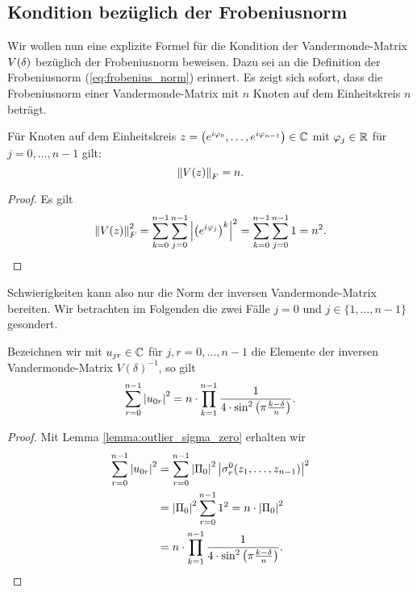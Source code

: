 \subsection{Kondition bezüglich der Frobeniusnorm}
Wir wollen nun eine explizite Formel für die Kondition der Vandermonde-Matrix
$V \! \left( \delta \right)$ bezüglich der Frobeniusnorm beweisen.
Dazu sei an die Definition der Frobeniusnorm (\ref{eq:frobenius_norm}) erinnert.
Es zeigt sich sofort, dass die Frobeniusnorm einer Vandermonde-Matrix mit
$n$ Knoten auf dem Einheitskreis $n$ beträgt.

\begin{lemma}
    Für Knoten auf dem Einheitskreis
    $z = \left(e^{i \varphi_0}, \dots, e^{i \varphi_{n-1}} \right) \in \mathbb{C}$
    mit $\varphi_j \in \mathbb{R}$ für $j = 0, \dots, n-1$ gilt:
    \begin{equation}
        \left\lVert V \! \left( z \right) \right\rVert_F = n.
    \end{equation}
\end{lemma}
\begin{proof}
    Es gilt
    \[
        \left\lVert V \! \left( z \right) \right\rVert_F^2
        = \sum_{k=0}^{n-1} \sum_{j=0}^{n-1} \left\lvert  \left(e^{i \varphi_j}\right)^k  \right\rvert^2
        = \sum_{k=0}^{n-1} \sum_{j=0}^{n-1} 1
        = n^2.
    \]
\end{proof}

Schwierigkeiten kann also nur die Norm der inversen Vandermonde-Matrix
bereiten.  Wir betrachten im Folgenden die zwei Fälle $j=0$ und
$j \in \{1, \dots, n-1\}$ gesondert.

\begin{lemma}
    \label{lemma:inverse_outlier_zero_row_quadratic_sum}
    Bezeichnen wir mit $u_{jr} \in \mathbb{C}$ für $j, r = 0, \dots, n-1$ die Elemente
    der inversen Vandermonde-Matrix $V(\delta)^{-1}$, so gilt
    \[
        \sum_{r=0}^{n-1} \left\lvert u_{0r} \right\rvert^2
        = n \cdot \prod_{k=1}^{n-1} \frac{1}{4 \cdot \sin^2 \left( \pi \frac{k-\delta}{n} \right)}.
    \]
\end{lemma}
\begin{proof}
    Mit Lemma \ref{lemma:outlier_sigma_zero} erhalten wir
    \[
        \begin{split}
            \sum_{r=0}^{n-1} \left\lvert u_{0r} \right\rvert^2
            &= \sum_{r=0}^{n-1} \left\lvert \Pi_0 \right\rvert^2 \left\lvert \sigma_{r}^{0}(z_1, \dots, z_{n-1}) \right\rvert^2\\
            &= \left\lvert \Pi_0 \right\rvert^2 \sum_{r=0}^{n-1} 1^2
            = n \cdot \left\lvert \Pi_0 \right\rvert^2\\
            &= n \cdot \prod_{k=1}^{n-1} \frac{1}{4 \cdot \sin^2 \left( \pi \frac{k-\delta}{n} \right)}.
        \end{split}
    \]
\end{proof}

